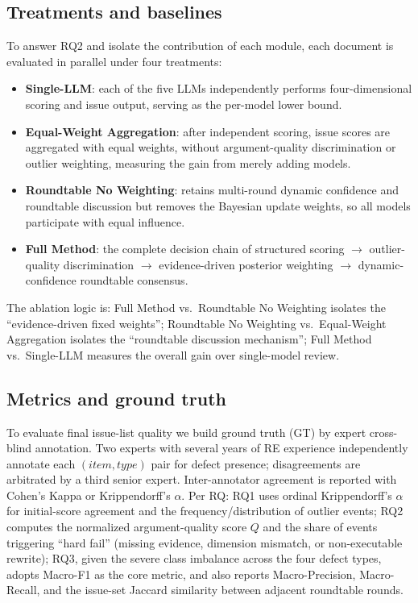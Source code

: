 \documentclass[sn-mathphys-num]{sn-jnl}
\begin{document}
\subsection{Treatments and baselines}\label{sec:treatments}
To answer RQ2 and isolate the contribution of each module, each document is evaluated in parallel under four treatments:
\begin{itemize}
\item \textbf{Single-LLM}: each of the five LLMs independently performs four-dimensional scoring and issue output, serving as the per-model lower bound.
\item \textbf{Equal-Weight Aggregation}: after independent scoring, issue scores are aggregated with equal weights, without argument-quality discrimination or outlier weighting, measuring the gain from merely adding models.
\item \textbf{Roundtable No Weighting}: retains multi-round dynamic confidence and roundtable discussion but removes the Bayesian update weights, so all models participate with equal influence.
\item \textbf{Full Method}: the complete decision chain of structured scoring $\to$ outlier-quality discrimination $\to$ evidence-driven posterior weighting $\to$ dynamic-confidence roundtable consensus.
\end{itemize}
The ablation logic is: Full Method vs.\ Roundtable No Weighting isolates the ``evidence-driven fixed weights''; Roundtable No Weighting vs.\ Equal-Weight Aggregation isolates the ``roundtable discussion mechanism''; Full Method vs.\ Single-LLM measures the overall gain over single-model review.



\subsection{Metrics and ground truth}\label{sec:metrics}
To evaluate final issue-list quality we build ground truth (GT) by expert cross-blind annotation. Two experts with several years of RE experience independently annotate each $(item,type)$ pair for defect presence; disagreements are arbitrated by a third senior expert. Inter-annotator agreement is reported with Cohen's Kappa or Krippendorff's $\alpha$. Per RQ: RQ1 uses ordinal Krippendorff's $\alpha$ for initial-score agreement and the frequency/distribution of outlier events; RQ2 computes the normalized argument-quality score $Q$ and the share of events triggering ``hard fail'' (missing evidence, dimension mismatch, or non-executable rewrite); RQ3, given the severe class imbalance across the four defect types, adopts Macro-F1 as the core metric, and also reports Macro-Precision, Macro-Recall, and the issue-set Jaccard similarity between adjacent roundtable rounds.
\end{document}

